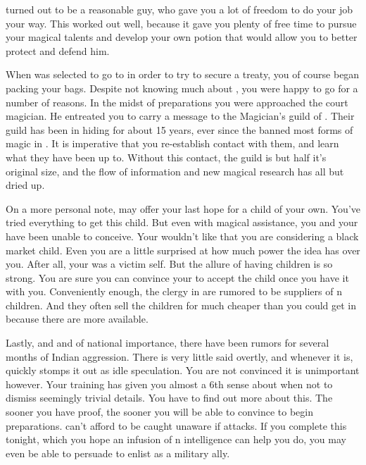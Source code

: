 \documentclass[char]{NeptuneBall}
\begin{document}
\cDancer{} turned out to be a reasonable guy, who gave you a lot of freedom to do your job your way. This worked out well, because it gave you plenty of free time to pursue your magical talents and develop your own potion that would allow you to better protect and defend him.

When \cDancer{} was selected to go to \pAtlantis{} in order to try to secure a treaty, you of course began packing your bags. Despite not knowing much about \pAtlantis{}, you were happy to go for a number of reasons. In the midst of preparations you were approached the court magician. He entreated you to carry a message to the Magician's guild of \pAtlantis{}.  Their guild has been in hiding for about 15 years, ever since the \cKing{\King} banned most forms of magic in \pAtlantis{}. It is imperative that you re-establish contact with them, and learn what they have been up to. Without this contact, the guild is but half it's original size, and the flow of information and new magical research has all but dried up.

On a more personal note, \pAtlantis{} may offer your last hope for a child of your own.  You've tried everything to get this child. But even with magical assistance, you and your \cVHusband{\spouse} have been unable to conceive. Your \cVHusband{\spouse} wouldn't like that you are considering a black market child. Even you are a little surprised at how much power the idea has over you. After all, your \cKGB{\sibling} was a victim \cKGB{\them}self. But the allure of having children is so strong.  You are sure you can convince your \cVHusband{\spouse} to accept the child once you have it with you.  Conveniently enough, the clergy in \pAtlantis{} are rumored to be suppliers of \pAtlantis{}n children. And they often sell the children for much cheaper than you could get in \pPacifica{} because there are more available.

Lastly, and and of national importance, there have been rumors for several months of Indian aggression. There is very little said overtly, and whenever it is, \cDancer{} quickly stomps it out as idle speculation. You are not convinced it is unimportant however. Your training has given you almost a 6th sense about when not to dismiss seemingly trivial details.  You have to find out more about this. The sooner you have proof, the sooner you will be able to convince \cDancer{} to begin preparations. \pPacifica{} can't afford to be caught unaware if \pIndia{} attacks.  If you complete this tonight, which you hope an infusion of \pAtlantis{}n intelligence can help you do, you may even be able to persuade \cDancer{} to enlist \pAtlantis{} as a military ally.
\end{document}
